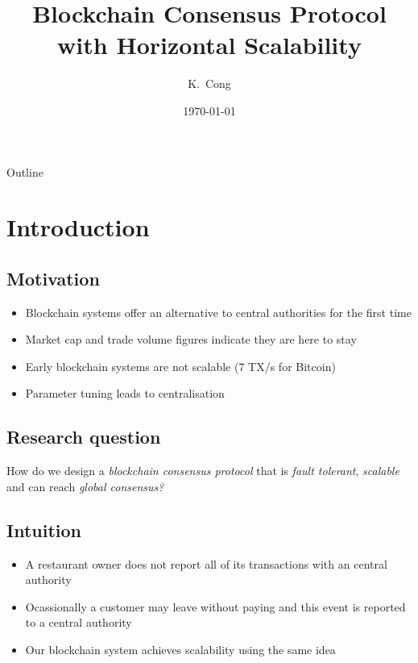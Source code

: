 \documentclass{beamer}
\title{Blockchain Consensus Protocol with Horizontal Scalability}
\author{K.~Cong}
\institute[Delft University of Technology] %
{
  Faculty of Electrical Engineering, Mathematics and Computer Science\\
  Delft University of Technology}
\date{\today}
\begin{document}
\begin{frame}
  \titlepage
\end{frame}

\begin{frame}{Outline}
  \tableofcontents
\end{frame}

\section{Introduction}
\subsection{Motivation}
\begin{frame}{\subsecname}{}
  \begin{itemize}
    \item Blockchain systems offer an alternative to central authorities for the first time
    \item Market cap and trade volume figures indicate they are here to stay
    \item Early blockchain systems are not scalable (7 TX/s for Bitcoin)
    \item Parameter tuning leads to centralisation
  \end{itemize}
\end{frame}

\subsection{Research question}
\begin{frame}{\subsecname}
    How do we design a \emph{blockchain consensus protocol} that is \emph{fault tolerant},
    \emph{scalable} and can reach \emph{global consensus?}
\end{frame}

\subsection{Intuition}
\begin{frame}{\subsecname}{}
  \begin{itemize}
    \item A restaurant owner does not report all of its transactions with an central authority
    \item Ocassionally a customer may leave without paying and this event is reported to a central authority
    \item Our blockchain system achieves scalability using the same idea
  \end{itemize}
\end{frame}
\end{document}
